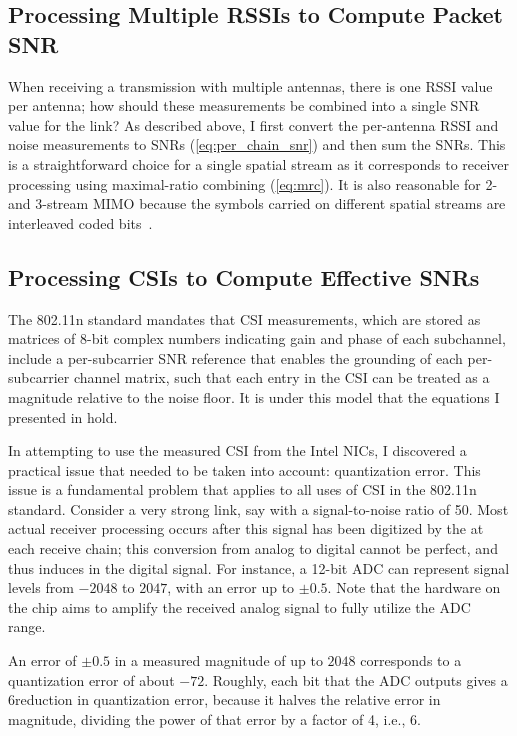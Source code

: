 \subsection{Processing Multiple RSSIs to Compute Packet SNR}
\label{sec:rssi_sum}
When receiving a transmission with multiple antennas, there is one RSSI value per antenna; how should these measurements be combined into a single SNR value for the link? As described above, I first convert the per-antenna RSSI and noise measurements to SNRs (\eqref{eq:per_chain_snr}) and then sum the SNRs. This is a straightforward choice for a single spatial stream as it corresponds to receiver processing using maximal-ratio combining (\eqref{eq:mrc}). It is also reasonable for 2- and 3-stream MIMO because the symbols carried on different spatial streams are interleaved coded bits~\cite{80211n}.

\subsection{Processing CSIs to Compute Effective SNRs}
The 802.11n standard mandates that CSI measurements, which are stored as matrices of 8-bit complex numbers indicating gain and phase of each subchannel, include a per-subcarrier SNR reference that enables the grounding of each per-subcarrier channel matrix, such that each entry in the CSI can be treated as a magnitude relative to the noise floor. It is under this model that the equations I presented in  hold.

In attempting to use the measured CSI from the Intel NICs, I discovered a practical issue that needed to be taken into account: quantization error. This issue is a fundamental problem that applies to all uses of CSI in the 802.11n standard. Consider a very strong link, say with a signal-to-noise ratio of 50\dB. Most actual receiver processing occurs after this signal has been digitized by the  at each receive chain; this conversion from analog to digital cannot be perfect, and thus induces  in the digital signal. For instance, a 12-bit ADC can represent signal levels from $-2048$ to $2047$, with an error up to $\pm0.5$. Note that the  hardware on the chip aims to amplify the received analog signal to fully utilize the ADC range.

An error of $\pm0.5$ in a measured magnitude of up to $2048$ corresponds to a quantization error of about $-72$\dB. Roughly, each bit that the ADC outputs gives a 6\dB reduction in quantization error, because it halves the relative error in magnitude, dividing the power of that error by a factor of 4, i.e., 6\dB.

